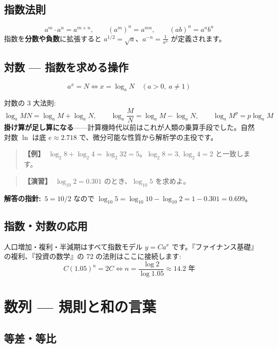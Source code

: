 \documentclass{article}
\begin{document}
\subsection{指数法則}

\[ a^m \cdot a^n = a^{m+n}, \qquad (a^m)^n = a^{mn}, \qquad (ab)^n = a^n b^n \]
指数を\textbf{分数や負数}に拡張すると \(a^{1/2} = \sqrt{a}\)、\(a^{-n} = \frac{1}{a^n}\) が定義されます。

\subsection{対数 — 指数を求める操作}

\[ a^x = N \iff x = \log_a N \quad (a > 0,\ a \neq 1) \]

対数の 3 大法則:
\[ \log_a MN = \log_a M + \log_a N, \qquad \log_a \frac{M}{N} = \log_a M - \log_a N, \qquad \log_a M^p = p \log_a M \]
\textbf{掛け算が足し算になる}——計算機時代以前はこれが人類の乗算手段でした。自然対数 \(\ln\) は底 \(e \approx 2.718\) で、微分可能な性質から解析学の主役です。

\begin{quote}
\textbf{【例】}\ \(\log_2 8 + \log_2 4 = \log_2 32 = 5\)。\(\log_2 8 = 3, \log_2 4 = 2\) と一致します。
\end{quote}

\begin{quote}
\textbf{【演習】}\ \(\log_{10} 2 = 0.301\) のとき、\(\log_{10} 5\) を求めよ。
\end{quote}

\textbf{解答の指針:}\ \(5 = 10/2\) なので \(\log_{10} 5 = \log_{10} 10 - \log_{10} 2 = 1 - 0.301 = 0.699\)。

\subsection{指数・対数の応用}

人口増加・複利・半減期はすべて指数モデル \(y = Ca^x\) です。『ファイナンス基礎』の複利、『投資の数学』の 72 の法則はここに接続します:
\[ C(1.05)^n = 2C \iff n = \frac{\log 2}{\log 1.05} \approx 14.2 \text{ 年} \]

\section{数列 — 規則と和の言葉}

\subsection{等差・等比}
\end{document}
